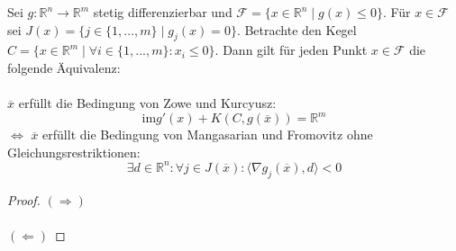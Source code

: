 
Sei $g: \mathbb R^n\to \mathbb R^m$ stetig differenzierbar und $\mathcal F=\{x\in\mathbb R^n\mid g(x)\leq 0\}$. Für $x\in\mathcal F$ sei $J(x)=\{j\in\{1,...,m\}\mid g_j(x)=0\}$. Betrachte den Kegel $C=\{x\in\mathbb R^m\mid \forall i\in\{1,...,m\}:x_i\leq 0\}$. Dann gilt für jeden Punkt $x\in\mathcal F$ die folgende Äquivalenz:\\\\
$\overline x$ erfüllt die Bedingung von Zowe und Kurcyusz: $$\text{im} g'(x)+K(C,g(\overline x))=\mathbb R^m$$
$\Leftrightarrow$ $\overline x$ erfüllt die Bedingung von Mangasarian und Fromovitz ohne Gleichungsrestriktionen:
$$\exists d\in\mathbb R^n:\forall j\in J(\overline x):\langle \nabla g_j(\overline x),d\rangle < 0$$
\begin{proof}
$(\Rightarrow)$\\\\
$(\Leftarrow)$
\end{proof}